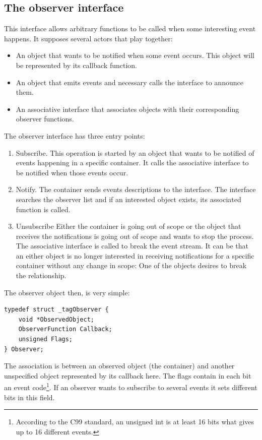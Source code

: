 \documentclass[12pt,a4paper,openany]{memoir} %
\newcommand{\container}{}
\begin{document}
{{\subsection{The observer interface}
\renewcommand{\container}{Observer}
This interface allows arbitrary functions to be called when some interesting event happens.
It supposes several actors that play together:
\begin{itemize}
\item An object that wants to be notified when some event occurs. This object will be represented by
its callback function.
\item An object that emits events and necessary calls the interface to announce them.
\item An associative interface that associates objects with their corresponding
observer functions.
\end{itemize}
The observer interface has three entry points:
\begin{enumerate}
\item Subscribe. This operation is started by an object that wants to be notified of events
happening in a specific container. It calls the associative interface to be notified
when those events occur.
\item Notify. The container sends events descriptions to the interface. The interface searches
the observer list and if an interested object exists, its associated function is called.
\item Unsubscribe Either the container is going out of scope or the object that receives
the notifications is going out of scope and wants to stop the process. The associative
interface is called to break the event stream. It can be that an either object is no
longer interested in receiving notifications for a specific container without any
change in scope: One of the objects desires to break the relationship.
\end{enumerate}
The observer object then, is very simple:
\begin{verbatim}
typedef struct _tagObserver {
    void *ObservedObject; 
    ObserverFunction Callback; 
    unsigned Flags; 
} Observer;
\end{verbatim}
The association is between an observed object (the container) and another unspecified object represented by its
callback here. The flags contain in each bit an event code\footnote{According to the C99 standard, an unsigned int is at
least 16 bits what gives up to 16 different events.}. If an observer wants to subscribe to several events
it sets different bits in this field.

}}
\end{document}
